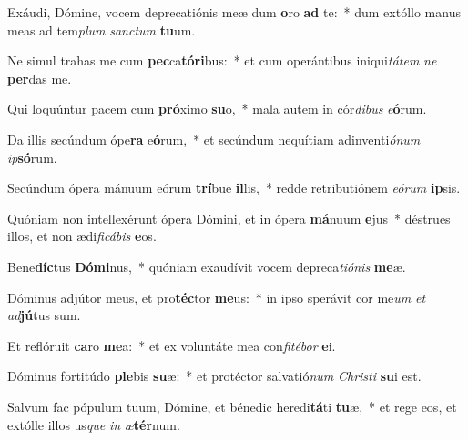 \item Exáudi, Dómine, vocem deprecatiónis meæ dum \textbf{o}ro \textbf{ad} te:~* dum extóllo manus meas ad tem\textit{plum} \textit{sanc}\textit{tum} \textbf{tu}um.
\item Ne simul trahas me cum \textbf{pec}ca\textbf{tó}\textbf{ri}bus:~* et cum operántibus iniqui\textit{tá}\textit{tem} \textit{ne} \textbf{per}das me.
\item Qui loquúntur pacem cum \textbf{pró}ximo \textbf{su}o,~* mala autem in cór\textit{di}\textit{bus} \textit{e}\textbf{ó}rum.
\item Da illis secúndum ópe\textbf{ra} e\textbf{ó}rum,~* et secúndum nequítiam adinventi\textit{ó}\textit{num} \textit{ip}\textbf{só}rum.
\item Secúndum ópera mánuum eórum \textbf{trí}bue \textbf{il}lis,~* redde retributiónem \textit{e}\textit{ó}\textit{rum} \textbf{ip}sis.
\item Quóniam non intellexérunt ópera Dómini, et in ópera \textbf{má}nuum \textbf{e}jus~* déstrues illos, et non ædi\textit{fi}\textit{cá}\textit{bis} \textbf{e}os.
\item Bene\textbf{díc}tus \textbf{Dó}\textbf{mi}nus,~* quóniam exaudívit vocem depreca\textit{ti}\textit{ó}\textit{nis} \textbf{me}æ.
\item Dóminus adjútor meus, et pro\textbf{téc}tor \textbf{me}us:~* in ipso sperávit cor me\textit{um} \textit{et} \textit{ad}\textbf{jú}tus sum.
\item Et reflóruit \textbf{ca}ro \textbf{me}a:~* et ex voluntáte mea con\textit{fi}\textit{té}\textit{bor} \textbf{e}i.
\item Dóminus fortitúdo \textbf{ple}bis \textbf{su}æ:~* et protéctor salvatió\textit{num} \textit{Chris}\textit{ti} \textbf{su}i est.
\item Salvum fac pópulum tuum, Dómine, et bénedic heredi\textbf{tá}ti \textbf{tu}æ,~* et rege eos, et extólle illos us\textit{que} \textit{in} \textit{æ}\textbf{tér}num.
